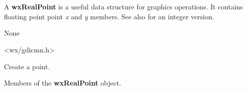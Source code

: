 \section{}\label{wxrealpoint}

A {\bf wxRealPoint} is a useful data structure for graphics operations.
It contains floating point point {\it x} and {\it y} members.
See also  for an integer version.


None


<wx/gdicmn.h>




\label{wxrealpointctor}



Create a point.



Members of the {\bf wxRealPoint} object.


